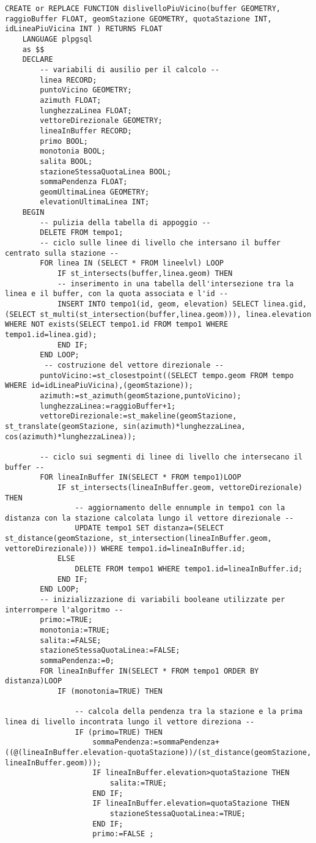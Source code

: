 \begin{lstlisting}[style=mySQL]
CREATE or REPLACE FUNCTION dislivelloPiuVicino(buffer GEOMETRY, raggioBuffer FLOAT, geomStazione GEOMETRY, quotaStazione INT, idLineaPiuVicina INT ) RETURNS FLOAT
	LANGUAGE plpgsql
	as $$
	DECLARE
		-- variabili di ausilio per il calcolo --
		linea RECORD;
		puntoVicino GEOMETRY;
		azimuth FLOAT;
		lunghezzaLinea FLOAT;
		vettoreDirezionale GEOMETRY;
		lineaInBuffer RECORD;
		primo BOOL;
		monotonia BOOL;
		salita BOOL;
		stazioneStessaQuotaLinea BOOL;
		sommaPendenza FLOAT;
		geomUltimaLinea GEOMETRY;
		elevationUltimaLinea INT;
	BEGIN
		-- pulizia della tabella di appoggio --
		DELETE FROM tempo1;
		-- ciclo sulle linee di livello che intersano il buffer centrato sulla stazione --
		FOR linea IN (SELECT * FROM lineelvl) LOOP
			IF st_intersects(buffer,linea.geom) THEN
			-- inserimento in una tabella dell'intersezione tra la linea e il buffer, con la quota associata e l'id --
			INSERT INTO tempo1(id, geom, elevation) SELECT linea.gid, (SELECT st_multi(st_intersection(buffer,linea.geom))), linea.elevation WHERE NOT exists(SELECT tempo1.id FROM tempo1 WHERE tempo1.id=linea.gid);
			END IF;
		END LOOP;
		 -- costruzione del vettore direzionale --
		puntoVicino:=st_closestpoint((SELECT tempo.geom FROM tempo WHERE id=idLineaPiuVicina),(geomStazione));
		azimuth:=st_azimuth(geomStazione,puntoVicino);
		lunghezzaLinea:=raggioBuffer+1;
		vettoreDirezionale:=st_makeline(geomStazione, st_translate(geomStazione, sin(azimuth)*lunghezzaLinea, cos(azimuth)*lunghezzaLinea));

		-- ciclo sui segmenti di linee di livello che intersecano il buffer --
		FOR lineaInBuffer IN(SELECT * FROM tempo1)LOOP
			IF st_intersects(lineaInBuffer.geom, vettoreDirezionale) THEN
				-- aggiornamento delle ennumple in tempo1 con la distanza con la stazione calcolata lungo il vettore direzionale --
				UPDATE tempo1 SET distanza=(SELECT st_distance(geomStazione, st_intersection(lineaInBuffer.geom, vettoreDirezionale))) WHERE tempo1.id=lineaInBuffer.id;
			ELSE
				DELETE FROM tempo1 WHERE tempo1.id=lineaInBuffer.id;
			END IF;
		END LOOP;
		-- inizializzazione di variabili booleane utilizzate per interrompere l'algoritmo --
		primo:=TRUE;
		monotonia:=TRUE;
		salita:=FALSE;
		stazioneStessaQuotaLinea:=FALSE;
		sommaPendenza:=0;
		FOR lineaInBuffer IN(SELECT * FROM tempo1 ORDER BY distanza)LOOP
			IF (monotonia=TRUE) THEN

				-- calcola della pendenza tra la stazione e la prima linea di livello incontrata lungo il vettore direziona --
				IF (primo=TRUE) THEN
					sommaPendenza:=sommaPendenza+((@(lineaInBuffer.elevation-quotaStazione))/(st_distance(geomStazione, lineaInBuffer.geom)));
					IF lineaInBuffer.elevation>quotaStazione THEN
						salita:=TRUE;
					END IF;
					IF lineaInBuffer.elevation=quotaStazione THEN
						stazioneStessaQuotaLinea:=TRUE;
					END IF;
					primo:=FALSE ;


\end{lstlisting}

